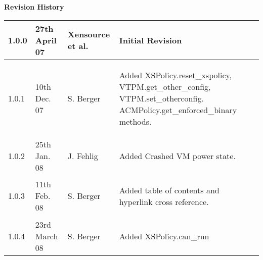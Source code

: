 { \bf Revision History}

\begin{center}
 \begin{tabular}{|l|l|l|l|}
  \hline
  1.0.0 & 27th April 07 & Xensource et al. &
   \begin{minipage}[t][.7cm]{7cm}
     Initial Revision
   \end{minipage}\\
  \hline
  1.0.1 & 10th Dec. 07 & S. Berger &
   \begin{minipage}[t]{7cm}
    \begin{flushleft}
     Added XSPolicy.reset\_xspolicy, VTPM.get\_other\_config,
     VTPM.set\_otherconfig. ACMPolicy.get\_enforced\_binary methods.
    \end{flushleft}
   \end{minipage}\\
  \hline
  1.0.2 & 25th Jan. 08 & J. Fehlig &
   \begin{minipage}[t]{7cm}
    \begin{flushleft}
     Added Crashed VM power state.
    \end{flushleft}
   \end{minipage}\\
  \hline
  1.0.3 & 11th Feb. 08 & S. Berger &
   \begin{minipage}[t]{7cm}
    \begin{flushleft}
     Added table of contents and hyperlink cross reference.
    \end{flushleft}
   \end{minipage}\\
  \hline
  1.0.4 & 23rd March 08 & S. Berger &
   \begin{minipage}[t]{7cm}
    \begin{flushleft}
     Added XSPolicy.can\_run
    \end{flushleft}
   \end{minipage}\\
  \hline
 \end{tabular}
\end{center}
